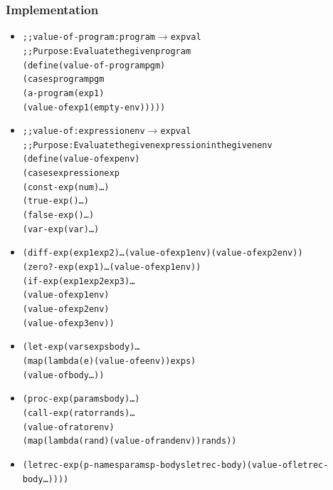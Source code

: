 \documentclass{beamer}
\newcommand{\arrow}{\(\rightarrow\)}
\begin{document}
\begin{frame}[fragile]
\frametitle{Implementation}
\begin{tiny}
\begin{itemize}
\item<1->
\begin{alltt}
;; value-of-program : program \arrow{} expval
;; Purpose: Evaluate the given program
(define (value-of-program pgm)
  (cases program pgm
    (a-program (exp1)
               (value-of exp1 (empty-env)))))
\end{alltt}

\item<2->
\begin{alltt}
;; value-of : expression env \arrow{} expval
;; Purpose: Evaluate the given expression in the given env
(define (value-of exp env)
  (cases expression exp
    (const-exp (num) \ldots)
    (true-exp () \ldots)
    (false-exp () \ldots)
    (var-exp (var) \ldots)
\end{alltt}

\item<3->
\begin{alltt}
    (diff-exp (exp1 exp2) \ldots (value-of exp1 env) (value-of exp2 env))
    (zero?-exp (exp1) \ldots (value-of exp1 env))
    (if-exp (exp1 exp2 exp3) \ldots
                             (value-of exp1 env)
                             (value-of exp2 env)
                             (value-of exp3 env))
\end{alltt}

\item<4->
\begin{alltt}
    (let-exp (vars exps body) \ldots
                              (map (lambda (e) (value-of e env)) exps)
                              (value-of body \dots))
\end{alltt}

\item<5->
\begin{alltt}
    (proc-exp (params body) \ldots)
    (call-exp (rator rands) \ldots
                            (value-of rator env)
                            (map (lambda (rand) (value-of rand env)) rands))
\end{alltt}

\item<6->
\begin{alltt}
    (letrec-exp (p-names params p-bodys letrec-body) (value-of letrec-body \ldots))))
\end{alltt}

\end{itemize}
\end{tiny}
\end{frame}
\end{document}
